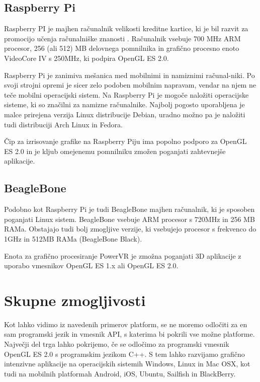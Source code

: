 \subsection{Raspberry Pi}
\label{sec:raspberryPi}

Raspberry PI je majhen računalnik velikosti kreditne kartice, ki je bil razvit za promocijo učenja računalniške znanosti \cite{rasPi}. Računalnik vsebuje 700 MHz ARM procesor, 256 (ali 512) MB delovnega pomnilnika in grafično procesno enoto VideoCore IV s 250MHz, ki podpira OpenGL ES 2.0.

Raspberry Pi je zanimiva mešanica med mobilnimi in namiznimi računal-niki. Po svoji strojni opremi je sicer zelo podoben mobilnim napravam, vendar na njem ne teče mobilni operacijski sistem. Na Raspberry Pi je mogoče naložiti operacijske sisteme, ki so značilni za namizne računalnike. Najbolj pogosto uporabljena je malce prirejena verzija Linux distribucije Debian, uradno možno pa je naložiti tudi distribuciji Arch Linux in Fedora.

Čip za izrisovanje grafike na Raspberry Piju ima popolno podporo za OpenGL ES 2.0 in je kljub omejenemu pomnilniku zmožen poganjati zahtevnejše aplikacije.

\subsection{BeagleBone}
\label{sec:beagleBone}

Podobno kot Raspberry Pi je tudi BeagleBone \cite{beagleBone} majhen računalnik, ki je sposoben poganjati Linux sistem. BeagleBone vsebuje ARM procesor s 720MHz in 256 MB RAMa. Obstajajo tudi bolj zmogljive verzije, ki vsebujejo procesor s frekvenco do 1GHz in 512MB RAMa (BeagleBone Black). 

Enota za grafično procesiranje PowerVR je zmožna poganjati 3D aplikacije z uporabo vmesnikov OpenGL ES 1.x ali OpenGL ES 2.0.

\section{Skupne zmogljivosti}

Kot lahko vidimo iz navedenih primerov platform, se ne moremo odločiti za en sam programski jezik in vmesnik API, s katerima bi pokrili vse možne platforme. Največji del trga lahko pokrijemo, če se odločimo za programski vmesnik OpenGL ES 2.0 s programskim jezikom C++. S  tem lahko razvijamo grafično intenzivne aplikacije na operacijskih sistemih Windows, Linux in Mac OSX, kot tudi na mobilnih platformah Android, iOS, Ubuntu, Sailfish in BlackBerry.

